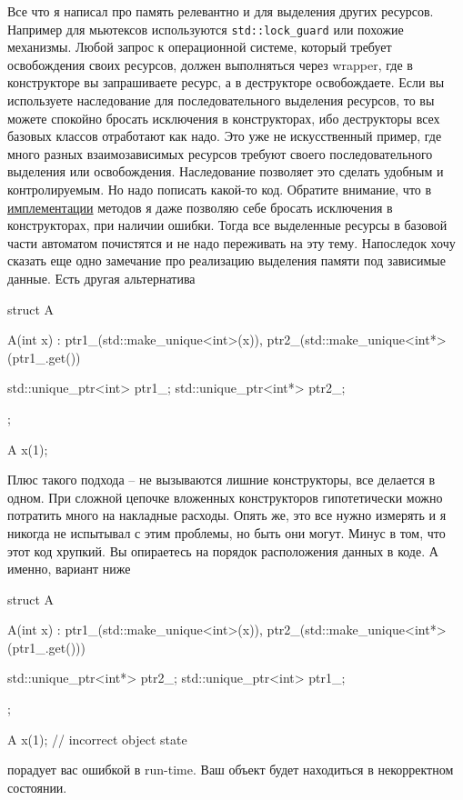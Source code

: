 Все что я написал про память релевантно и для выделения других ресурсов.
Например для мьютексов используются \verb"std::lock_guard" или похожие механизмы.
Любой запрос к операционной системе, который требует освобождения своих ресурсов, должен выполняться через wrapper, где в конструкторе вы запрашиваете ресурс, а в деструкторе освобождаете.
Если вы используете наследование для последовательного выделения ресурсов, то вы можете спокойно бросать исключения в конструкторах, ибо деструкторы всех базовых классов отработают как надо.
Это уже не искусственный пример, где много разных взаимозависимых ресурсов требуют своего последовательного выделения или освобождения.
Наследование позволяет это сделать удобным и контролируемым.
Но надо пописать какой-то код.
Обратите внимание, что в \href{https://github.com/DimaTrushin/TypingAnalysisQt/blob/master/ThreadPool.cpp}{имплементации} методов я даже позволяю себе бросать исключения в конструкторах, при наличии ошибки.
Тогда все выделенные ресурсы в базовой части автоматом почистятся и не надо переживать на эту тему.
Напоследок хочу сказать еще одно замечание про реализацию выделения памяти под зависимые данные.
Есть другая альтернатива
\begin{cppcode}
struct A {
  A(int x)
   : ptr1_(std::make_unique<int>(x)),
     ptr2_(std::make_unique<int*>(ptr1_.get()) {}
  
  std::unique_ptr<int> ptr1_;
  std::unique_ptr<int*> ptr2_;
};

A x(1);
\end{cppcode}
Плюс такого подхода -- не вызываются лишние конструкторы, все делается в одном.
При сложной цепочке вложенных конструкторов гипотетически можно потратить много на накладные расходы.
Опять же, это все нужно измерять и я никогда не испытывал с этим проблемы, но быть они могут.
Минус в том, что этот код хрупкий.
Вы опираетесь на порядок расположения данных в коде.
А именно, вариант ниже
\begin{cppcode}
struct A {
  A(int x)
   : ptr1_(std::make_unique<int>(x)),
     ptr2_(std::make_unique<int*>(ptr1_.get())) {}
  
  std::unique_ptr<int*> ptr2_;
  std::unique_ptr<int> ptr1_;
};

A x(1); // incorrect object state
\end{cppcode}
порадует вас ошибкой в run-time.
Ваш объект будет находиться в некорректном состоянии.
